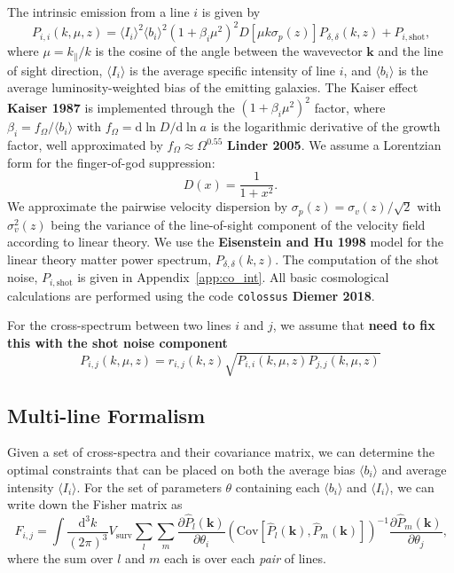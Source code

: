 \documentclass{aastex62}
\newcommand{\beq}{\begin{equation}}
\newcommand{\eeq}{\end{equation}}
\newcommand{\Cov}[2]{\mathrm{Cov}[#1,#2]}
\newcommand{\avg}[1]{\ensuremath{\langle #1 \rangle}}
\begin{document}
The intrinsic emission from a line $i$ is given by
\beq\label{eq:int_ps}
P_{i,i}(k, \mu, z) = \avg{I_i}^2 \avg{b_i}^2 (1 + \beta_i \mu^2)^2 
              D\left[\mu k \sigma_p(z)\right] P_{\delta, \delta}(k, z)
              + P_{i, \text{shot}}\text{,}
\eeq
where $\mu=k_{\parallel}/k$ is the cosine of the angle between the wavevector
$\bm{k}$ and the line of sight direction, $\avg{I_i}$ is the average specific
intensity of line $i$, and $\avg{b_i}$ is the average luminosity-weighted bias
of the emitting galaxies. The Kaiser effect {\bf Kaiser 1987} is implemented
through the $(1 + \beta_i \mu^2)^2$ factor, where $\beta_i =
f_{\Omega}/\avg{b_i}$ with $f_{\Omega} = \text{d}\ln{D}/\text{d}\ln{a}$ is the
logarithmic derivative of the growth factor, well approximated by $f_{\Omega}
\approx \Omega^{0.55}$ {\bf Linder 2005}. We assume a Lorentzian form for the
finger-of-god suppression:
\beq\label{eq:fog}
D(x) = \frac{1}{1+x^2}\text{.}
\eeq
We approximate the pairwise velocity dispersion by $\sigma_p(z) =
\sigma_v(z)/\sqrt{2}$ with $\sigma_v^2(z)$ being the variance of the
line-of-sight component of the velocity field according to linear theory. We
use the {\bf Eisenstein and Hu 1998} model for the linear theory matter power
spectrum, $P_{\delta,\delta}(k, z)$. The computation of the shot noise,
$P_{i,\text{shot}}$ is given in Appendix~\ref{app:co_int}. All basic
cosmological calculations are performed using the code \texttt{colossus} {\bf
Diemer 2018}.

For the cross-spectrum between two lines $i$ and $j$, we assume that {\bf need
to fix this with the shot noise component}
\beq\label{eq:cross_spec}
P_{i,j}(k, \mu, z) = r_{i,j}(k, z) \sqrt{P_{i,i}(k, \mu, z) P_{j,j}(k, \mu, z)}
\eeq

\subsection{Multi-line Formalism}\label{ssec:multi_line}
Given a set of cross-spectra and their covariance matrix, we can determine the
optimal constraints that can be placed on both the average bias $\avg{b_i}$
and average intensity $\avg{I_i}$. For the set of parameters $\theta$
containing each $\avg{b_i}$ and $\avg{I_i}$, we can write down the Fisher
matrix as
\beq\label{eq:fisher}
F_{i,j} = 
\int \frac{\text{d}^3k}{(2\pi)^3} V_{\text{surv}}
\sum_{l} \sum_{m}
\frac{\partial \hat{P}_{l}(\bm{k})}{\partial \theta_i}
\left(\Cov{\hat{P}_{l}(\bm{k})}{\hat{P}_{m}(\bm{k})}\right)^{-1}
\frac{\partial \hat{P}_{m}(\bm{k})}{\partial \theta_j}\text{,}
\eeq
where the sum over $l$ and $m$ each is over each \emph{pair} of lines.
\end{document}
